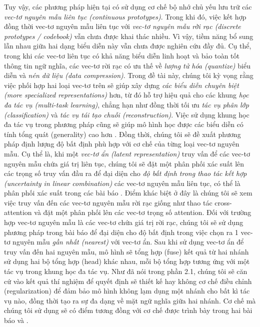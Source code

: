 {Tuy vậy, các phương pháp hiện tại có sử dụng cơ chế bộ nhớ chủ yếu lưu trữ các \textit{vec-tơ nguyên mẫu liên tục (continuous prototypes)}. Trong khi đó, việc kết hợp đồng thời vec-tơ nguyên mẫu liên tục với \textit{vec-tơ nguyên mẫu rời rạc (discrete prototypes / codebook)} vẫn chưa được khai thác nhiều. Vì vậy, tiềm năng bổ sung lẫn nhau giữa hai dạng biểu diễn này vẫn chưa được nghiên cứu đầy đủ. Cụ thể, trong khi các vec-tơ liên tục có khả năng biểu diễn linh hoạt và bảo toàn tốt thông tin ngữ nghĩa, các vec-tơ rời rạc có ưu thế về \textit{lượng tử hóa (quantize)} biểu diễn và \textit{nén dữ liệu (data compression)}. Trong đề tài này, chúng tôi kỳ vọng rằng việc phối hợp hai loại vec-tơ trên sẽ giúp xây dựng \textit{các biểu diễn chuyên biệt (more specialized representations)} hơn, từ đó hỗ trợ hiệu quả cho các khung \textit{học đa tác vụ (multi-task learning)}, chẳng hạn như đồng thời tối ưu \textit{tác vụ phân lớp (classification)} và \textit{tác vụ tái tạo chuỗi (reconstruction)}. Việc sử dụng khung học đa tác vụ trong phương pháp cũng sẽ giúp mô hình học được các biểu diễn có tính tổng quát (generality) cao hơn \cite{10.1109/TPAMI.2022.3195549}. Đồng thời, chúng tôi sẽ đề xuất phương pháp định lượng độ bất định phù hợp với cơ chế của từng loại vec-tơ nguyên mẫu. Cụ thể là, khi một \textit{vec-tơ ẩn (latent representation)} truy vấn để các vec-tơ nguyên mẫu chứa giá trị liên tục, chúng tôi sẽ đặt một phân phối xác suất lên các trọng số truy vấn đầu ra để đại diện cho \textit{độ bất định trong thao tác kết hợp (uncertainty in linear combination)} các vec-tơ nguyên mẫu liên tục, có thể là phân phối xác suất trong các bài báo \cite{10.5555/3495724.3497097} \cite{Pei_Wang_Szarvas_2022}. Điểm khác biệt ở đây là chúng tôi sẽ xem việc truy vấn đến các vec-tơ nguyên mẫu rời rạc giống như thao tác cross-attention và đặt một phân phối lên các vec-tơ trọng số attention. Đối với trường hợp vec-tơ nguyên mẫu là các vec-tơ chứa giá trị rời rạc, chúng tôi sẽ sử dụng phương pháp trong bài báo \cite{pmlr-v139-ramesh21a} để đại diện cho độ bất định trong việc chọn ra 1 vec-tơ nguyên mẫu \textit{gần nhất (nearest)} với vec-tơ ẩn. Sau khi sử dụng vec-tơ ẩn để truy vấn đến hai nguyên mẫu, mô hình sẽ tổng hợp (fuse) kết quả từ hai nhánh sử dụng hai bộ tổng hợp (head) khác nhau, mỗi bộ tổng hợp tương ứng với một tác vụ trong khung học đa tác vụ. Như đã nói trong phần 2.1, chúng tôi sẽ căn cứ vào kết quả thí nghiệm để quyết định sẽ thiết kế hay không cơ chế điều chỉnh (regularization) để đảm bảo mô hình không lạm dụng một nhánh cho bất kì tác vụ nào, đồng thời tạo ra sự đa dạng về mặt ngữ nghĩa giữa hai nhánh. Cơ chế mà chúng tôi sử dụng sẽ có điểm tương đồng với cơ chế được trình bày trong hai bài báo \cite{bardes2022vicreg} và \cite{Kim_2026_WACV}.

}
